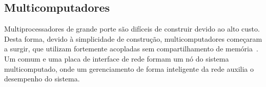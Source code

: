 %
%
%
%
%
%
%
%
%
\subsection{Multicomputadores}

%
%
%
%
Multiprocessadores de grande porte são difíceis de construir devido ao alto
custo. Desta forma, devido à simplicidade de construção, multicomputadores
começaram a surgir, que utilizam \cpus fortemente acopladas sem compartilhamento
de memória~\cite{Tanenbaum2015}. Um \pc comum e uma placa de interface de rede formam um nó do
sistema multicomputado, onde um gerenciamento de forma inteligente da rede auxilia o desempenho
do sistema.

